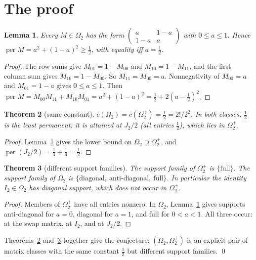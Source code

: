 \documentclass[11pt]{article}
\newtheorem{theorem}{Theorem}
\newtheorem{lemma}[theorem]{Lemma}
\theoremstyle{definition}
\theoremstyle{remark}
\renewcommand{\_}{\oldus\allowbreak}
\newcommand{\per}{\operatorname{per}}
\begin{document}
\section{The proof}

\begin{lemma}\label{lem:form}
Every $M\in\Omega_2$ has the form $\begin{pmatrix} a & 1-a\\ 1-a & a\end{pmatrix}$ with
$0\le a\le1$. Hence $\per M=a^2+(1-a)^2\ge\tfrac12$, with equality iff $a=\tfrac12$.
\end{lemma}
\begin{proof}
The row sums give $M_{01}=1-M_{00}$ and $M_{10}=1-M_{11}$, and the first column sum gives
$M_{10}=1-M_{00}$. So $M_{11}=M_{00}=a$. Nonnegativity of $M_{00}=a$ and $M_{01}=1-a$ gives
$0\le a\le1$. Then
$\per M=M_{00}M_{11}+M_{10}M_{01}=a^2+(1-a)^2=\tfrac12+2(a-\tfrac12)^2$.
\end{proof}

\begin{theorem}[same constant]\label{thm:const}
$c(\Omega_2)=c(\Omega_2^{+})=\tfrac12=2!/2^2$. In both classes, $\tfrac12$ is the \emph{least}
permanent: it is attained at $J_2/2$ (all entries $\tfrac12$), which lies in $\Omega_2^{+}$.
\end{theorem}
\begin{proof}
Lemma~\ref{lem:form} gives the lower bound on $\Omega_2\supseteq\Omega_2^{+}$, and
$\per(J_2/2)=\tfrac14+\tfrac14=\tfrac12$.
\end{proof}

\begin{theorem}[different support families]\label{thm:supp}
The support family of $\Omega_2^{+}$ is $\{\text{full}\}$. The support family of $\Omega_2$ is
$\{\text{diagonal},\ \text{anti-diagonal},\ \text{full}\}$. In particular the identity
$I_2\in\Omega_2$ has diagonal support, which does not occur in $\Omega_2^{+}$.
\end{theorem}
\begin{proof}
Members of $\Omega_2^{+}$ have all entries nonzero. In $\Omega_2$, Lemma~\ref{lem:form} gives
supports anti-diagonal for $a=0$, diagonal for $a=1$, and full for $0<a<1$. All three occur: at
the swap matrix, at $I_2$, and at $J_2/2$.
\end{proof}

Theorems~\ref{thm:const} and~\ref{thm:supp} together give the conjecture: $(\Omega_2,\Omega_2^{+})$ is
an explicit pair of matrix classes with the same constant $\tfrac12$ but different support
families. \qed
\end{document}
